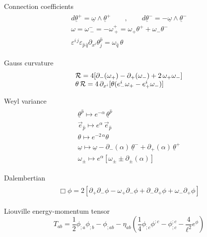 \documentclass[a4paper,10pt]{article}
\begin{document}
Connection coefficients
\begin{eqnarray} \begin{array}{l}
 d {\underline \theta}^+={\underline \omega} \wedge {\underline \theta}^+
\qquad,\qquad 
d {\underline \theta}^-=- {\underline \omega} \wedge
 {\underline \theta}^- \\
\omega= \omega^-_{\ -}=-\omega^+_{\ +}=\omega_+\theta^+ +  \omega_-\theta^- \\
\varepsilon^{i\, j}\varepsilon_{\hat p\, \hat q}\partial_{x^i}
\theta^{\hat  p}_j = \omega_{\hat q}\, \theta
\end{array}\end{eqnarray}

Gauss curvature
\begin{eqnarray} \begin{array}{l}
 {\cal R}=4[\partial_-(\omega_+)-\partial_+(\omega_-)+ 2\,\omega_+\omega_-]\\
\theta\, {\cal R}=4\, \partial_{x^i}[\theta (e^i_-\omega_+ - e^i_+\omega_- )]\\
\end{array}\end{eqnarray}

Weyl variance
\begin{eqnarray} \begin{array}{l}
 {\underline \theta}^{\hat p}\mapsto e^{-\alpha}\, 
{\underline \theta}^{\hat p}\\
{\vec e}_{\hat p}\mapsto e^{\alpha}\,{\vec e}_{\hat p}\\
\theta \mapsto  e^{-2\,\alpha}\theta\\
{\underline \omega} \mapsto {\underline \omega} - 
\partial_-(\alpha)\,{\underline \theta^-} + \partial_+(\alpha)\,
{\underline \theta^+}\\ 
\omega_\pm \mapsto e^{\alpha}\left[\omega_\pm \pm \partial_\pm (\alpha)\right]
\end{array} \end{eqnarray}

Dalembertian
\begin{eqnarray} \begin{array}{l}
\Box \phi=2 \left [ \partial_+ \partial_- \phi - \omega_+ \partial _- \phi
+\partial_- \partial_+ \phi + \omega_- \partial_+ \phi \right ]
\end{array} \end{eqnarray}

Liouville energy-momentum tensor
\begin{equation}
T_{ab}=  \frac 1 2 \phi _{;a} \phi _{;b} -\phi_{;ab} -\eta_{ab}
(\frac 1 4 \phi_{;c} \phi^{;c} - \phi _{;c}^{;c} - \frac 4 {\ell^2} e^\phi)
\end{equation}
\end{document}
